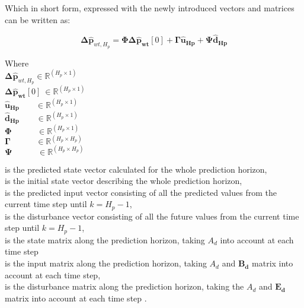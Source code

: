 Which in short form, expressed with the newly introduced vectors and matrices can be written as: 

\begin{equation}
	\bm{\Delta \hat{p}}_{wt,H_p} = \bm{\Phi} \bm{\Delta \hat{p}}_{\bm{wt}}[0] + \bm{\Gamma} \bm{\hat{u}}_{\bm{Hp}} + \bm{\Psi} \bm{\hat{d}}_{\bm{Hp}}
	\label{extendedmatrix}
\end{equation}

\begin{minipage}[t]{0.3\textwidth}
Where\\
\hspace*{8mm} $\bm{\Delta \hat{p}}_{wt,H_p} \in \pmb{\mathbb{R}}^{(H_p \times 1)}$ \\
\newline
\hspace*{8mm} $\bm{\Delta \hat{p}}_{\bm{wt}}[0] \:\in \pmb{\mathbb{R}}^{(H_p \times 1)}$ \\
\hspace*{8mm} $\bm{\hat{u}_{\bm{Hp}}} \:\:\:\:\:\:\:\:\, \in \pmb{\mathbb{R}}^{(H_p \times 1)}$ \\
\newline
\hspace*{8mm} $\bm{\hat{d}_{\bm{Hp}}} \:\:\:\:\:\:\:\:\: \in \pmb{\mathbb{R}}^{(H_p \times 1)}$ \\
\newline
\hspace*{8mm} $\bm{\Phi} \:\:\:\:\:\:\:\:\:\:\:\:\:\, \in \pmb{\mathbb{R}}^{(H_p \times 1)}$ \\
\newline
\hspace*{8mm} $\bm{\Gamma} \:\:\:\:\:\:\:\:\:\:\:\:\:\, \in \pmb{\mathbb{R}}^{(H_p \times H_p)}$ \\
\newline
\hspace*{8mm} $\bm{\Psi} \:\:\:\:\:\:\:\:\:\:\:\:\:\, \in \pmb{\mathbb{R}}^{(H_p \times H_p)}$ 
\end{minipage}
\begin{minipage}[t]{0.64\textwidth}
\vspace*{2mm}
is the predicted state vector calculated for the whole prediction horizon, \\
is the initial state vector describing the whole prediction horizon, \\
is the predicted input vector consisting of all the predicted values from the current time step until $k = H_p-1$, \\
is the disturbance vector consisting of all the future values from the current time step until $k = H_p-1$, \\
is the state matrix along the prediction horizon, taking $A_d$ into account at each time step \\
is the input matrix along the prediction horizon, taking $A_d$ and $\bm{B_d}$ matrix into account at each time step, \\
is the disturbance matrix along the prediction horizon, taking the $A_d$ and $\bm{E_d}$ matrix into account at each time step . \\ 
\end{minipage}

